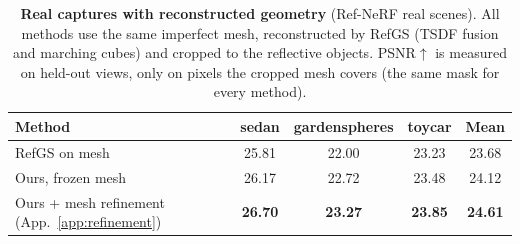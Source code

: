 \begin{table}[t]
\color{addcolor}
\centering
\footnotesize
\caption{\textbf{Real captures with reconstructed geometry} (Ref-NeRF real scenes). All methods use
the same imperfect mesh, reconstructed by RefGS (TSDF fusion and marching cubes) and cropped to
the reflective objects. PSNR$\uparrow$ is measured on held-out views, only on pixels the cropped
mesh covers (the same mask for every method).}
\label{tab:real}
\begin{tabular}{@{}lcccc@{}}
\toprule
Method & sedan & gardenspheres & toycar & Mean \\
\midrule
RefGS on mesh~\citep{refgs} & 25.81 & 22.00 & 23.23 & 23.68 \\
Ours, frozen mesh & 26.17 & 22.72 & 23.48 & 24.12 \\
Ours + mesh refinement (App.~\ref{app:refinement}) & \textbf{26.70} & \textbf{23.27} & \textbf{23.85} & \textbf{24.61} \\
\bottomrule
\end{tabular}
\vspace{-2mm}
\end{table}
